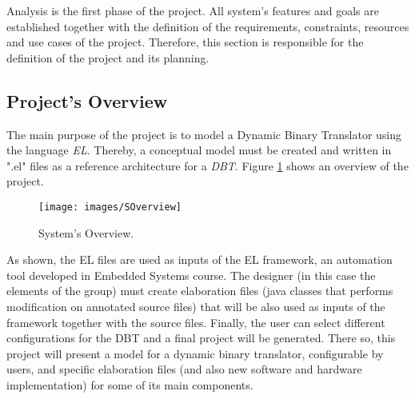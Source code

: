 Analysis is the first phase of the project. All system's features and goals are established together with the definition of the requirements, constraints, resources and use cases of the project. Therefore, this section is responsible for the definition of the project and its planning.

\subsection{Project's Overview}
The main purpose of the project is to model a Dynamic Binary Translator using the language \textit{EL}. Thereby, a conceptual model must be created and written in ".el" files as a reference architecture for a \textit{DBT}. Figure \ref{fig:SOverview} shows an overview of the project.

\begin{figure}[!htb]
\centering
\texttt{[image: images/SOverview]}
\caption{System's Overview.}
\label{fig:SOverview} 
\end{figure}

As shown, the EL files are used as inputs of the EL framework, an automation tool developed in Embedded Systems course. The designer (in this case the elements of the group) must create elaboration files (java classes that performs modification on annotated source files) that will be also used as inputs of the framework together with the source files. Finally, the user can select different configurations for the DBT and a final project will be generated.
There so, this project will present a model for a dynamic binary translator, configurable by users, and specific elaboration files (and also new software and hardware implementation) for some of its main components.


